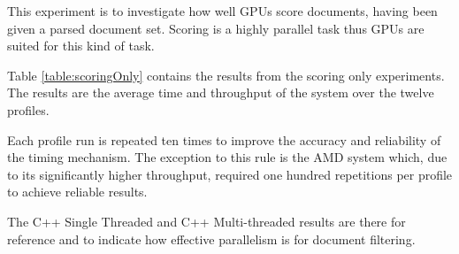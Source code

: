 This experiment is to investigate how well GPUs score documents, having been
given a parsed document set. Scoring is a highly parallel task thus GPUs are
suited for this kind of task.

Table \ref{table:scoringOnly} contains the results from the scoring only
experiments. The results are the average time and throughput of the system over
the twelve profiles.

Each profile run is repeated ten times to improve the accuracy and reliability
of the timing mechanism. The exception to this rule is the AMD system which,
due to its significantly higher throughput, required one hundred repetitions
per profile to achieve reliable results.

The C++ Single Threaded and C++ Multi-threaded results are there for reference
and to indicate how effective parallelism is for document filtering.

